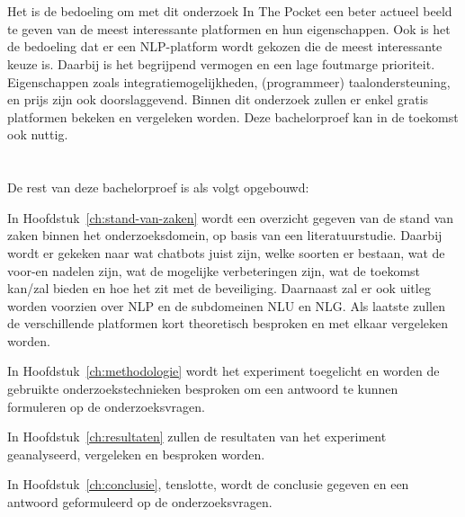 \section{}
\label{sec:onderzoeksdoelstelling}

Het is de bedoeling om met dit onderzoek In The Pocket een beter actueel beeld te geven van de meest interessante platformen en hun eigenschappen. Ook is het de bedoeling dat er een NLP-platform wordt gekozen die de meest interessante keuze is. Daarbij is het begrijpend vermogen en een lage foutmarge prioriteit. Eigenschappen zoals integratiemogelijkheden, (programmeer) taalondersteuning, en prijs zijn ook doorslaggevend. Binnen dit onderzoek zullen er enkel gratis platformen bekeken en vergeleken worden. Deze bachelorproef kan in de toekomst ook nuttig.

\newpage
\section{}
\label{sec:opzet-bachelorproef}


De rest van deze bachelorproef is als volgt opgebouwd:

In Hoofdstuk~\ref{ch:stand-van-zaken} wordt een overzicht gegeven van de stand van zaken binnen het onderzoeksdomein, op basis van een literatuurstudie.  Daarbij wordt er gekeken naar wat chatbots juist zijn, welke soorten er bestaan, wat de voor-en nadelen zijn, wat de mogelijke verbeteringen zijn, wat de toekomst kan/zal bieden en hoe het zit met de beveiliging. Daarnaast zal er ook uitleg worden voorzien over NLP en de subdomeinen NLU en NLG. Als laatste zullen de verschillende platformen kort theoretisch besproken en met elkaar vergeleken worden.

In Hoofdstuk~\ref{ch:methodologie} wordt het experiment toegelicht en worden de gebruikte onderzoekstechnieken besproken om een antwoord te kunnen formuleren op de onderzoeksvragen.

In Hoofdstuk~\ref{ch:resultaten}  zullen de resultaten van het experiment geanalyseerd, vergeleken en besproken worden.

In Hoofdstuk~\ref{ch:conclusie}, tenslotte, wordt de conclusie gegeven en een antwoord geformuleerd op de onderzoeksvragen.









